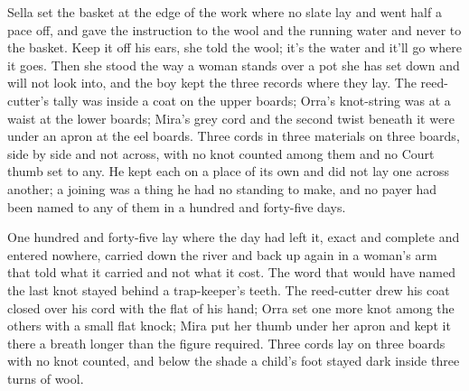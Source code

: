 Sella set the basket at the edge of the work where no slate lay and went half a pace off, and gave the instruction to the wool and the running water and never to the basket. Keep it off his ears, she told the wool; it's the water and it'll go where it goes. Then she stood the way a woman stands over a pot she has set down and will not look into, and the boy kept the three records where they lay. The reed-cutter's tally was inside a coat on the upper boards; Orra's knot-string was at a waist at the lower boards; Mira's grey cord and the second twist beneath it were under an apron at the eel boards. Three cords in three materials on three boards, side by side and not across, with no knot counted among them and no Court thumb set to any. He kept each on a place of its own and did not lay one across another; a joining was a thing he had no standing to make, and no payer had been named to any of them in a hundred and forty-five days.

One hundred and forty-five lay where the day had left it, exact and complete and entered nowhere, carried down the river and back up again in a woman's arm that told what it carried and not what it cost. The word that would have named the last knot stayed behind a trap-keeper's teeth. The reed-cutter drew his coat closed over his cord with the flat of his hand; Orra set one more knot among the others with a small flat knock; Mira put her thumb under her apron and kept it there a breath longer than the figure required. Three cords lay on three boards with no knot counted, and below the shade a child's foot stayed dark inside three turns of wool.

